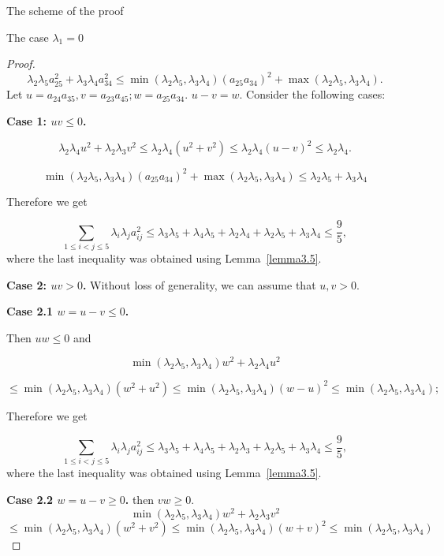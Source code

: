 \documentclass[12pt]{article}
\begin{document}
\begin{section}{The scheme of the proof}
\begin{section}{The case  \texorpdfstring{$\lambda_{1} = 0$}{Lg}}
\begin{proof}
    $$
        \lambda_{2}\lambda_{5}a_{25}^{2} + \lambda_{3}\lambda_{4}a_{34}^{2} \leq \min(\lambda_{2}\lambda_{5},\lambda_{3}\lambda_{4} )(a_{25}a_{34})^{2} + \max(\lambda_{2}\lambda_{5},\lambda_{3}\lambda_{4} ).
    $$
    Let $u=a_{24}a_{35}, v = a_{23}a_{45}; w = a_{25}a_{34}.$ $u-v=w.$  Consider the following cases:
    
    \textbf{Case 1: $uv\leq 0$.} 

    $$
        \lambda_{2}\lambda_{4}u^{2} + \lambda_{2}\lambda_{3}v^{2} \leq   \lambda_{2}\lambda_{4}(u^{2} + v^{2}) \leq \lambda_{2}\lambda_{4}(u - v)^{2} \leq \lambda_{2}\lambda_{4}.
    $$

    $$
     \min(\lambda_{2}\lambda_{5},\lambda_{3}\lambda_{4} )(a_{25}a_{34})^{2} + \max(\lambda_{2}\lambda_{5},\lambda_{3}\lambda_{4} ) \leq \lambda_{2}\lambda_{5} + \lambda_{3}\lambda_{4}
    $$

    Therefore we get
    
    $$
        \sum_{1\leq i < j\leq 5}\lambda_{i}\lambda_{j} a_{ij}^{2} \leq \lambda_{3}\lambda_{5} + \lambda_{4}\lambda_{5} + \lambda_{2}\lambda_{4} + \lambda_{2}\lambda_{5} + \lambda_{3}\lambda_{4}\leq \frac{9}{5},
    $$
    where the last inequality was obtained using Lemma~\ref{lemma3.5}. 
    
    \textbf{Case 2: $uv > 0$.}
    Without loss of generality, we can assume that 
    $u,v>0$.
    
    \textbf{Case 2.1 $w = u-v \leq 0$.}
    
    Then $ uw\leq 0$ and  

    $$
        \min(\lambda_{2}\lambda_{5},\lambda_{3}\lambda_{4} )w^{2} + \lambda_{2}\lambda_{4}u^{2}
        $$
        
        $$
        \leq \min(\lambda_{2}\lambda_{5},\lambda_{3}\lambda_{4} )(w^{2} + u^{2}) \leq \min(\lambda_{2}\lambda_{5},\lambda_{3}\lambda_{4} )(w - u)^{2} \leq \min(\lambda_{2}\lambda_{5},\lambda_{3}\lambda_{4} );
    $$

     Therefore we get
    
    $$
        \sum_{1\leq i < j\leq 5}\lambda_{i}\lambda_{j} a_{ij}^{2} \leq \lambda_{3}\lambda_{5} + \lambda_{4}\lambda_{5} + \lambda_{2}\lambda_{3} + \lambda_{2}\lambda_{5} + \lambda_{3}\lambda_{4}\leq \frac{9}{5},
    $$
    where the last inequality was obtained using Lemma~\ref{lemma3.5}.

    \textbf{Case  2.2 $w = u-v \geq 0$.} then $vw\geq 0.$
    $$
        \min(\lambda_{2}\lambda_{5},\lambda_{3}\lambda_{4} )w^{2} + \lambda_{2}\lambda_{3}v^{2}     
        $$
        $$\leq \min(\lambda_{2}\lambda_{5},\lambda_{3}\lambda_{4} )(w^{2} + v^{2}) \leq \min(\lambda_{2}\lambda_{5},\lambda_{3}\lambda_{4} )(w + v)^{2} \leq \min(\lambda_{2}\lambda_{5},\lambda_{3}\lambda_{4} )
    $$


\end{proof}
\end{section}
\end{section}
\end{document}
